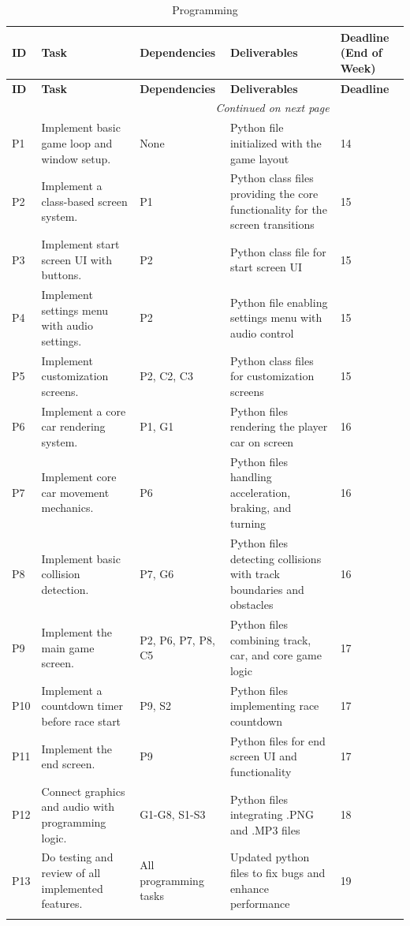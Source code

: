 \documentclass[12pt]{article}
\begin{document}
\noindent\begin{longtable}{|l|p{}|p{}|p{}|p{}|}
\hline
\textbf{ID} & \textbf{Task} & \textbf{Dependencies} & \textbf{Deliverables} & \textbf{Deadline (End of Week)} \\
\hline
\endfirsthead

\hline
\textbf{ID} & \textbf{Task} & \textbf{Dependencies} & \textbf{Deliverables} & \textbf{Deadline} \\
\hline
\endhead

\hline
\multicolumn{4}{r}{\small\textit{Continued on next page}} \\
\endfoot

\hline
\endlastfoot

P1 & Implement basic game loop and window setup. & None & Python file initialized with the game layout & 14 \\
\hline
P2 & Implement a class-based screen system. & P1 & Python class files providing the core functionality for the screen transitions & 15 \\
\hline
P3 & Implement start screen UI with buttons. & P2 & Python class file for start screen UI & 15 \\
\hline
P4 & Implement settings menu with audio settings. & P2 & Python file enabling settings menu with audio control & 15 \\
\hline
P5 & Implement customization screens. & P2, C2, C3 & Python class files for customization screens & 15 \\
\hline
P6 & Implement a core car rendering system. & P1, G1 & Python files rendering the player car on screen & 16 \\
\hline
P7 & Implement core car movement mechanics. & P6 & Python files handling acceleration, braking, and turning & 16 \\
\hline
P8 & Implement basic collision detection. & P7, G6 & Python files detecting collisions with track boundaries and obstacles & 16 \\
\hline
P9 & Implement the main game screen. & P2, P6, P7, P8, C5 & Python files combining track, car, and core game logic & 17 \\
\hline
P10 & Implement a countdown timer before race start & P9, S2 & Python files implementing race countdown & 17 \\
\hline
P11 & Implement the end screen. & P9 & Python files for end screen UI and functionality & 17 \\
\hline
P12 & Connect graphics and audio with programming logic. & G1-G8, S1-S3 & Python files integrating .PNG and .MP3 files & 18 \\
\hline
P13 & Do testing and review of all implemented features. & All programming tasks & Updated python files to fix bugs and enhance performance & 19 \\
\hline

\caption{Programming}
\end{longtable}
\end{document}
